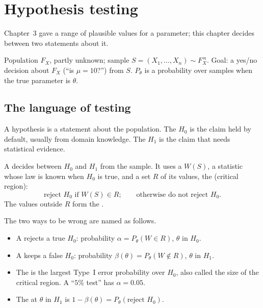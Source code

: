 \chapter{Hypothesis testing}

Chapter~3 gave a range of plausible values for a parameter; this chapter decides between two statements about it.

\begin{setup}
Population $F_X$, partly unknown; sample $S=(X_1,\dots,X_n)\sim F_X^{\,n}$. Goal: a yes/no decision about $F_X$ (``is $\mu=10$?'') from $S$. $P_\theta$ is a probability over samples when the true parameter is $\theta$.
\end{setup}

\section{The language of testing}

\begin{definition}[Hypotheses]
A hypothesis is a statement about the population. The  $H_0$ is the claim held by default, usually from domain knowledge. The  $H_1$ is the claim that needs statistical evidence.
\end{definition}

\begin{definition}[Test]
A  decides between $H_0$ and $H_1$ from the sample. It uses a  $W(S)$, a statistic whose law is known when $H_0$ is true, and a set $R$ of its values, the  (critical region):
\[
  \boxed{\;\text{reject }H_0\text{ if }W(S)\in R;\qquad\text{otherwise do not reject }H_0.\;}
\]
The values outside $R$ form the .
\end{definition}

\begin{definition}
The two ways to be wrong are named as follows.
\begin{itemize}
  \item A  rejects a true $H_0$: probability $\alpha=P_\theta(W\in R)$, $\theta$ in $H_0$.
  \item A  keeps a false $H_0$: probability $\beta(\theta)=P_\theta(W\notin R)$, $\theta$ in $H_1$.
  \item The  is the largest Type~I error probability over $H_0$, also called the size of the critical region. A ``$5\%$ test'' has $\alpha=0.05$.
  \item The  at $\theta$ in $H_1$ is $1-\beta(\theta)=P_\theta(\text{reject }H_0)$.
\end{itemize}
\end{definition}

